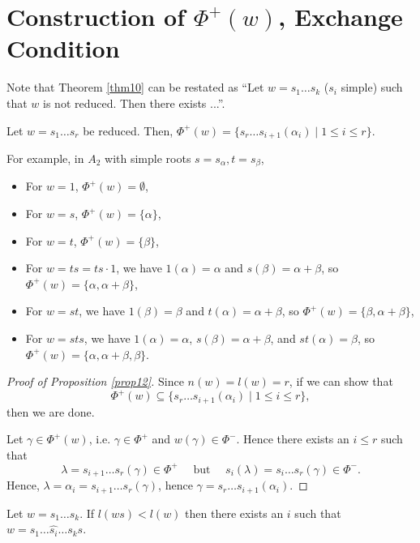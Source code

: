 \section{Construction of $\Phi^+(w)$, Exchange Condition}

Note that Theorem \ref{thm10} can be restated as ``Let $w = s_1 \dots s_k$
($s_i$ simple) such that $w$ is not reduced. Then there exists ...''.

\begin{proposition} \label{prop12}
Let $w = s_1 \dots s_r$ be reduced. Then, $\Phi^+(w) =
\{ s_r \dots s_{i+1} (\alpha_i) \mid 1 \leq i \leq r\}$.
\end{proposition}

For example, in $A_2$ with simple roots $s = s_\alpha, t = s_\beta$,
\begin{itemize}
\item For $w = 1$, $\Phi^+(w) = \emptyset$,
\item For $w = s$, $\Phi^+(w) = \{\alpha\}$,
\item For $w = t$, $\Phi^+(w) = \{\beta\}$,
\item For $w = ts = ts \cdot 1$, we have $1(\alpha) = \alpha$
and $s(\beta) = \alpha+\beta$, so
$\Phi^+(w) = \{\alpha, \alpha + \beta\}$,
\item For $w = st$, we have $1(\beta) = \beta$
and $t(\alpha) = \alpha+\beta$, so
$\Phi^+(w) = \{\beta, \alpha + \beta\}$,
\item For $w = sts$, we have $1(\alpha) = \alpha$,
$s(\beta) = \alpha+\beta$, and
$st(\alpha) = \beta$,
so $\Phi^+(w) = \{\alpha, \alpha + \beta, \beta\}$.
\end{itemize}

\begin{proof}[Proof of Proposition \ref{prop12}]
Since $n(w) = l(w) = r$, if we can show that
\[
\Phi^+(w) \subseteq \{ s_r \dots s_{i+1} (\alpha_i) \mid 1 \leq i \leq r\},
\]
then we are done.

Let $\gamma \in \Phi^+(w)$, i.e. $\gamma \in \Phi^+$ and $w(\gamma) \in \Phi^-$.
Hence there exists an $i \leq r$ such that
\[
    \lambda = s_{i+1} \dots s_r (\gamma) \in \Phi^+
\quad \text{ but } \quad
    s_i(\lambda) = s_{i} \dots s_r (\gamma) \in \Phi^-.
\]
Hence, $\lambda = \alpha_i = s_{i+1} \dots s_r (\gamma) $, hence
$\gamma = s_r \dots s_{i+1}(\alpha_i)$.
\end{proof}

\begin{theorem} \label{thm13}
Let $w = s_1 \dots s_k$. If $l(ws) < l(w)$ then there exists an $i$ such that
$w = s_1 \dots \hat{s_i} \dots s_k s$.
\end{theorem}

